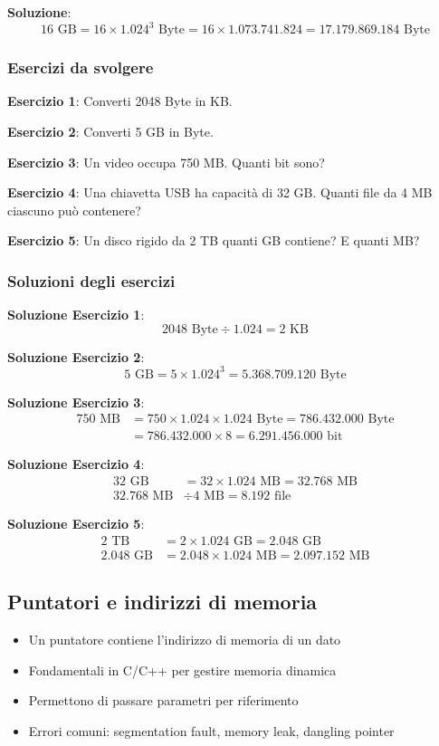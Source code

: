 \documentclass[12pt,a4paper]{article}
\begin{document}
\textbf{Soluzione}:
\[
16 \text{ GB} = 16 \times 1.024^3 \text{ Byte} = 16 \times 1.073.741.824 = 17.179.869.184 \text{ Byte}
\]

\subsubsection{Esercizi da svolgere}

\textbf{Esercizio 1}: Converti 2048 Byte in KB.

\textbf{Esercizio 2}: Converti 5 GB in Byte.

\textbf{Esercizio 3}: Un video occupa 750 MB. Quanti bit sono?

\textbf{Esercizio 4}: Una chiavetta USB ha capacità di 32 GB. Quanti file da 4 MB ciascuno può contenere?

\textbf{Esercizio 5}: Un disco rigido da 2 TB quanti GB contiene? E quanti MB?

\subsubsection{Soluzioni degli esercizi}

\textbf{Soluzione Esercizio 1}: 
\[
2048 \text{ Byte} \div 1.024 = 2 \text{ KB}
\]

\textbf{Soluzione Esercizio 2}:
\[
5 \text{ GB} = 5 \times 1.024^3 = 5.368.709.120 \text{ Byte}
\]

\textbf{Soluzione Esercizio 3}:
\begin{align*}
750 \text{ MB} &= 750 \times 1.024 \times 1.024 \text{ Byte} = 786.432.000 \text{ Byte} \\
&= 786.432.000 \times 8 = 6.291.456.000 \text{ bit}
\end{align*}

\textbf{Soluzione Esercizio 4}:
\begin{align*}
32 \text{ GB} &= 32 \times 1.024 \text{ MB} = 32.768 \text{ MB} \\
32.768 \text{ MB} &\div 4 \text{ MB} = 8.192 \text{ file}
\end{align*}

\textbf{Soluzione Esercizio 5}:
\begin{align*}
2 \text{ TB} &= 2 \times 1.024 \text{ GB} = 2.048 \text{ GB} \\
2.048 \text{ GB} &= 2.048 \times 1.024 \text{ MB} = 2.097.152 \text{ MB}
\end{align*}

\subsection{Puntatori e indirizzi di memoria}
\begin{itemize}
    \item Un puntatore contiene l'indirizzo di memoria di un dato
    \item Fondamentali in C/C++ per gestire memoria dinamica
    \item Permettono di passare parametri per riferimento
    \item Errori comuni: segmentation fault, memory leak, dangling pointer
\end{itemize}
\end{document}
